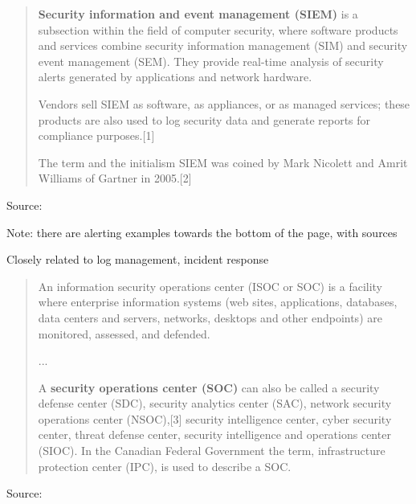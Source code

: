 \documentclass[Screen16to9,17pt]{foils}
\begin{document}


\begin{quote}
{\bf Security information and event management (SIEM)} is a subsection within the field of computer security, where software products and services combine security information management (SIM) and security event management (SEM). They provide real-time analysis of security alerts generated by applications and network hardware.

  Vendors sell SIEM as software, as appliances, or as managed services; these products are also used to log security data and generate reports for compliance purposes.[1]

  The term and the initialism SIEM was coined by Mark Nicolett and Amrit Williams of Gartner in 2005.[2]
\end{quote}
Source: 

\begin{list2}
  \item Note: there are alerting examples towards the bottom of the page, with sources
  \item Closely related to log management, incident response
\end{list2}




\begin{quote}
An information security operations center (ISOC or SOC) is a facility where enterprise information systems (web sites, applications, databases, data centers and servers, networks, desktops and other endpoints) are monitored, assessed, and defended.

...

A {\bf security operations center (SOC)} can also be called a security defense center (SDC), security analytics center (SAC), network security operations center (NSOC),[3] security intelligence center, cyber security center, threat defense center, security intelligence and operations center (SIOC). In the Canadian Federal Government the term, infrastructure protection center (IPC), is used to describe a SOC.
\end{quote}
Source: 

\end{document}
